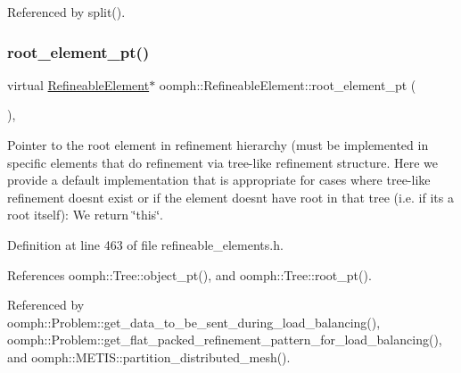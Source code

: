 Referenced by split().

\mbox{\label{classoomph_1_1RefineableElement_a2528930c573e50ff2eca36619713e051}} 
\subsubsection{\texorpdfstring{root\+\_\+element\+\_\+pt()}{root\_element\_pt()}}
{\footnotesize\ttfamily virtual \hyperlink{classoomph_1_1RefineableElement}{Refineable\+Element}$\ast$ oomph\+::\+Refineable\+Element\+::root\+\_\+element\+\_\+pt (\begin{DoxyParamCaption}{ }\end{DoxyParamCaption})\hspace{0.3cm}{\ttfamily [inline]}, {\ttfamily [virtual]}}



Pointer to the root element in refinement hierarchy (must be implemented in specific elements that do refinement via tree-\/like refinement structure. Here we provide a default implementation that is appropriate for cases where tree-\/like refinement doesn\textquotesingle{}t exist or if the element doesn\textquotesingle{}t have root in that tree (i.\+e. if it\textquotesingle{}s a root itself)\+: We return \char`\"{}this\char`\"{}. 



Definition at line 463 of file refineable\+\_\+elements.\+h.



References oomph\+::\+Tree\+::object\+\_\+pt(), and oomph\+::\+Tree\+::root\+\_\+pt().



Referenced by oomph\+::\+Problem\+::get\+\_\+data\+\_\+to\+\_\+be\+\_\+sent\+\_\+during\+\_\+load\+\_\+balancing(), oomph\+::\+Problem\+::get\+\_\+flat\+\_\+packed\+\_\+refinement\+\_\+pattern\+\_\+for\+\_\+load\+\_\+balancing(), and oomph\+::\+M\+E\+T\+I\+S\+::partition\+\_\+distributed\+\_\+mesh().

\mbox{\label{classoomph_1_1RefineableElement_a2a129d9c143cb0bb330c1bcba0343826}} 
